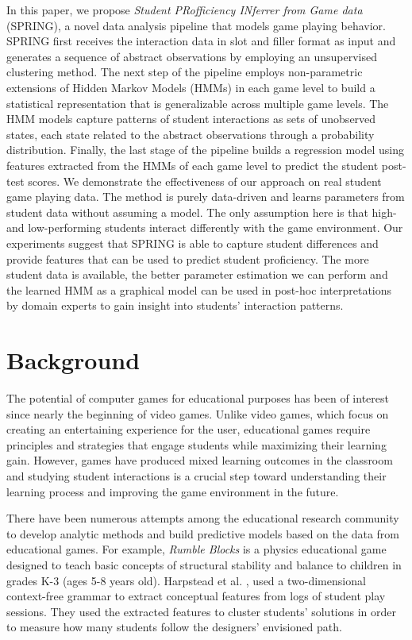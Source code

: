 \documentclass{sigchi}
\def\algname{SPRING\xspace}
\begin{document}
In this paper, we propose \textit{Student PRofficiency INferrer from Game data} (SPRING), a novel data analysis pipeline that models game playing behavior.
\algname first receives the interaction data in slot and filler format as input and generates a sequence of abstract observations by employing an unsupervised clustering method. 
The next step of the pipeline employs non-parametric extensions of Hidden Markov Models (HMMs) in each game level to build a statistical representation that is generalizable across multiple game levels. 
The HMM models capture patterns of student interactions as sets of unobserved states, each state related to the abstract observations through a probability distribution. 
Finally, the last stage of the pipeline builds a regression model using features extracted from the HMMs of each game level to predict the student post-test scores.
We demonstrate the effectiveness of our approach on real student game playing data.
The method is purely data-driven and learns parameters from student data without assuming a model. 
The only assumption here is that high- and low-performing students interact differently with the game environment.
Our experiments suggest that \algname is able to capture student differences and provide features that can be used to predict student proficiency.
The more student data is available, the better parameter estimation we can perform and the learned HMM as a graphical model can be used in post-hoc interpretations by domain experts to gain insight into students' interaction patterns.

\section{Background}
The potential of computer games for educational purposes has been of interest since nearly the beginning of video games. Unlike video games, which focus on creating an entertaining experience for the user, educational games require principles and strategies that engage students while maximizing their learning gain. However, games have produced mixed learning outcomes in the classroom \cite{harpstead2013search,mayo2009video} and studying student interactions is a crucial step toward understanding their learning process and improving the game environment in the future.

There have been numerous attempts among the educational research community to develop analytic methods and build predictive models based on the data from educational games. For example, \textit {Rumble Blocks} \cite{christel2012rumbleblocks} is a physics educational game designed to teach basic concepts of structural stability and balance to children in grades K-3 (ages 5-8 years old). Harpstead et al. \cite{harpstead2013investigating}, used a two-dimensional context-free grammar to extract conceptual features from  logs of student play sessions. They used the extracted features to cluster students' solutions in order to measure how many students follow the designers’ envisioned path.
\end{document}
